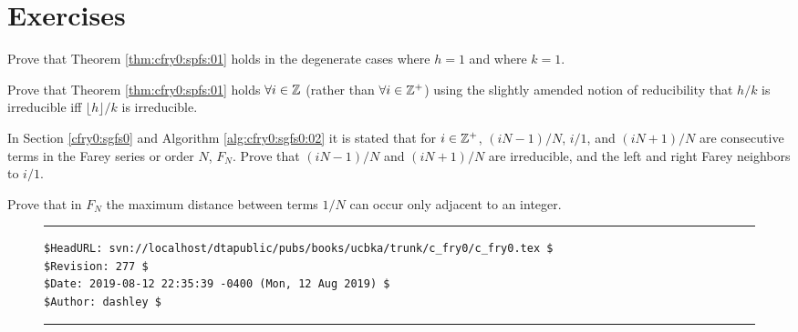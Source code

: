 \section{Exercises}

\begin{vworkexercisestatement}
\label{exe:cfry0:sexe0:01}
Prove that Theorem \ref{thm:cfry0:spfs:01}
holds in the degenerate cases where $h=1$ and where $k=1$.
\end{vworkexercisestatement}
\vworkexercisefooter{}

\begin{vworkexercisestatement}
\label{exe:cfry0:sexe0:02}
Prove that Theorem \ref{thm:cfry0:spfs:01} holds $\forall i \in {\mathbb{Z}}$
(rather than $\forall i \in {\mathbb{Z}^+}$) using
the slightly amended notion of reducibility that $h/k$ is irreducible iff
$\lfloor h \rfloor / k$ is irreducible.
\end{vworkexercisestatement}
\vworkexercisefooter{}

\begin{vworkexercisestatement}
In Section \ref{cfry0:sgfs0} and Algorithm \ref{alg:cfry0:sgfs0:02}
it is stated that for $i \in {\mathbb{Z}^+}$, 
$(iN-1)/N$, $i/1$, and $(iN+1)/N$ are consecutive terms in the Farey series
or order $N$, $F_N$.  Prove that $(iN-1)/N$ and $(iN+1)/N$ are irreducible,
and the left and right Farey neighbors to $i/1$.
\end{vworkexercisestatement}
\vworkexercisefooter{}

\begin{vworkexercisestatement}
Prove that in $F_N$ the maximum distance between terms $1/N$ can occur
only adjacent to an integer.
\end{vworkexercisestatement}
\vworkexercisefooter{}



\noindent\begin{figure}[!b]
\noindent\rule[-0.25in]{\textwidth}{1pt}
\begin{tiny}
\begin{verbatim}
$HeadURL: svn://localhost/dtapublic/pubs/books/ucbka/trunk/c_fry0/c_fry0.tex $
$Revision: 277 $
$Date: 2019-08-12 22:35:39 -0400 (Mon, 12 Aug 2019) $
$Author: dashley $
\end{verbatim}
\end{tiny}
\noindent\rule[0.25in]{\textwidth}{1pt}
\end{figure}

%

